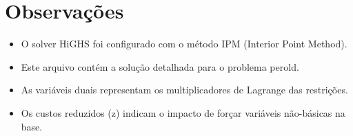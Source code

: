 \documentclass[12pt]{article}
\begin{document}
\section{Observações}

\begin{itemize}
\item O solver HiGHS foi configurado com o método IPM (Interior Point Method).
\item Este arquivo contém a solução detalhada para o problema perold.
\item As variáveis duais representam os multiplicadores de Lagrange das restrições.
\item Os custos reduzidos (z) indicam o impacto de forçar variáveis não-básicas na base.
\end{itemize}
\end{document}
